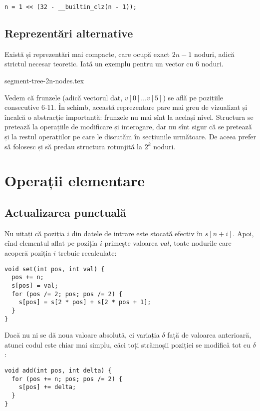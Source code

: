 \begin{verbatim}
n = 1 << (32 - __builtin_clz(n - 1));
\end{verbatim}

\subsection{Reprezentări alternative}

Există și reprezentări mai compacte, care ocupă exact $2n-1$ noduri, adică strictul necesar teoretic. Iată un exemplu pentru un vector cu 6 noduri.

{segment-tree-2n-nodes.tex}

Vedem că frunzele (adică vectorul dat, $v[0] \dots v[5]$) se află pe pozițiile consecutive 6-11. În schimb, această reprezentare pare mai greu de vizualizat și încalcă o abstracție importantă: frunzele nu mai sînt la același nivel. Structura se pretează la operațiile de modificare și interogare, dar nu sînt sigur că se pretează și la restul operațiilor pe care le discutăm în secțiunile următoare. De aceea prefer să folosesc și să predau structura rotunjită la $2^k$ noduri.

\section{Operații elementare}

\subsection{Actualizarea punctuală}

Nu uitați că poziția $i$ din datele de intrare este stocată efectiv în $s[n + i]$. Apoi, cînd elementul aflat pe poziția $i$ primește valoarea $val$, toate nodurile care acoperă poziția $i$ trebuie recalculate:

\begin{verbatim}
void set(int pos, int val) {
  pos += n;
  s[pos] = val;
  for (pos /= 2; pos; pos /= 2) {
    s[pos] = s[2 * pos] + s[2 * pos + 1];
  }
}
\end{verbatim}

Dacă nu ni se dă noua valoare absolută, ci variația $\delta$ față de valoarea anterioară, atunci codul este chiar mai simplu, căci toți strămoșii poziției se modifică tot cu $\delta$:

\begin{verbatim}
void add(int pos, int delta) {
  for (pos += n; pos; pos /= 2) {
    s[pos] += delta;
  }
}
\end{verbatim}

